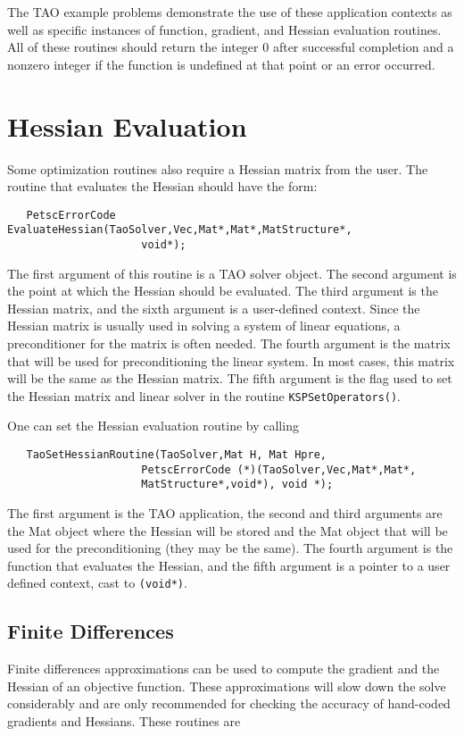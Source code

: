 The TAO example problems demonstrate the use of these application contexts
as well as specific instances of function, gradient, and Hessian 
evaluation routines.
All of these routines should return the integer $0$ after 
successful completion and a nonzero integer if the function
is undefined at that point or an error occurred.

\section{Hessian Evaluation}
\label{sec:matrixfree}
\label{sec:finitedifference}

Some optimization routines also require a Hessian matrix from the user.
The routine that evaluates the Hessian should have the form:
\begin{verbatim}
   PetscErrorCode EvaluateHessian(TaoSolver,Vec,Mat*,Mat*,MatStructure*,
                     void*);
\end{verbatim}
\noindent
The first argument of this routine is a TAO solver object.  The second
argument is the point at which the Hessian should be evaluated.  The
third argument is the Hessian matrix, and the sixth argument is a
user-defined context.
Since the Hessian matrix is usually used in solving
a system of linear equations, a preconditioner for the matrix is often
needed.  The fourth argument is the matrix that will be used
for preconditioning the linear system.  In most cases, this
matrix will be the same as the Hessian matrix.  The fifth
argument is the flag used to set the Hessian matrix and
linear solver in the routine {\tt KSPSetOperators()}.

One can set the Hessian evaluation routine by calling 
\begin{verbatim}
   TaoSetHessianRoutine(TaoSolver,Mat H, Mat Hpre,
                     PetscErrorCode (*)(TaoSolver,Vec,Mat*,Mat*,
                     MatStructure*,void*), void *);
\end{verbatim}
\noindent
The first argument is the TAO application, the second and third arguments
are the Mat object where the Hessian will be stored and the Mat object
that will be used for the preconditioning (they may be the same). The fourth 
argument is the function that evaluates the Hessian, 
and the fifth argument is a pointer to a user defined context,
cast to {\tt (void*)}.

\subsection{Finite Differences} 
Finite differences approximations can be used to compute the gradient and the
Hessian of an objective
function.  These approximations will slow down the solve considerably and are only 
recommended for checking the accuracy of hand-coded gradients and Hessians.
These routines are 

